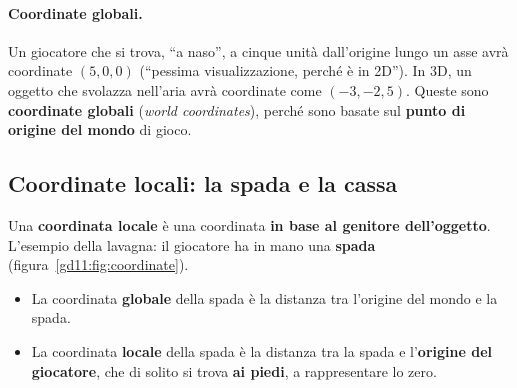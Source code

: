 \paragraph{Coordinate globali.} Un giocatore che si trova, ``a naso'', a
cinque unità dall'origine lungo un asse avrà coordinate $(5,0,0)$ (``pessima
visualizzazione, perché è in 2D''). In 3D, un oggetto che svolazza nell'aria
avrà coordinate come $(-3,-2,5)$. Queste sono \textbf{coordinate globali}
(\emph{world coordinates}), perché sono basate sul \textbf{punto di origine del
mondo} di gioco.

\subsection{Coordinate locali: la spada e la cassa}

Una \textbf{coordinata locale} è una coordinata \textbf{in base al genitore
dell'oggetto}. L'esempio della lavagna: il giocatore ha in mano una
\textbf{spada} (figura~\ref{gd11:fig:coordinate}).
\begin{itemize}
  \item La coordinata \textbf{globale} della spada è la distanza tra
        l'origine del mondo e la spada.
  \item La coordinata \textbf{locale} della spada è la distanza tra la spada
        e l'\textbf{origine del giocatore}, che di solito si trova
        \textbf{ai piedi}, a rappresentare lo zero.
\end{itemize}

